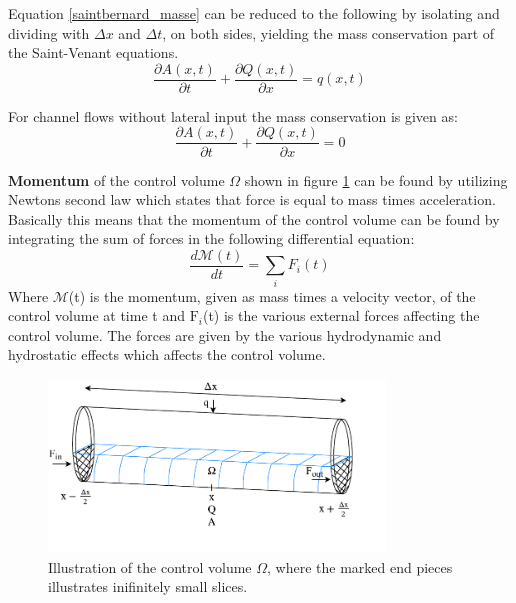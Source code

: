 Equation \ref{saintbernard_masse} can be reduced to the following by isolating and dividing with $\Delta x$ and $\Delta t$, on both sides, yielding the mass conservation part of the Saint-Venant equations.
\begin{equation}	
\frac{\partial A(x,t)}{\partial t} + \frac{\partial Q(x,t)}{\partial x}=q(x,t)
\label{saintbernard_mass_lateral}
\end{equation}

For channel flows without lateral input the mass conservation is given as:
\begin{equation}	
\boxed{\frac{\partial A(x,t)}{\partial t} + \frac{\partial Q(x,t)}{\partial x}=0}
\label{saintbernard_mass}
\end{equation}


\textbf{Momentum} of the control volume $\Omega$ shown in figure \ref{fig:momentum_picture} can be found by utilizing Newtons second law which states that force is equal to mass times acceleration.  
Basically this means that the momentum of the control volume can be found by integrating the sum of forces in the following differential equation:
\begin{equation}\label{eq:momentum_eq}
	\frac{d \mathcal{M}(t)}{dt} = \sum_{i}F_i(t)
\end{equation} 
Where $\mathcal{M}$(t) is the momentum, given as mass times a velocity vector, of the control volume at time t and $\text{F}_i$(t) is the various external forces affecting the control volume. The forces are given by the various hydrodynamic and hydrostatic effects which affects the control volume.  

\begin{figure}[H]
\centering
\includegraphics[width=0.8\textwidth]{report/modeling/pictures/momentum_fig.pdf}
\caption{Illustration of the control volume $\Omega$, where the marked end pieces illustrates inifinitely small slices.}
\label{fig:momentum_picture}
\end{figure}

